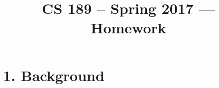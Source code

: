 \documentclass[11pt]{article}
\title{CS 189 -- Spring 2017 --- Homework \Homework}
\author{\Name}%
\date{}
\begin{document}
\maketitle

\section*{1. Background}
\end{document}
